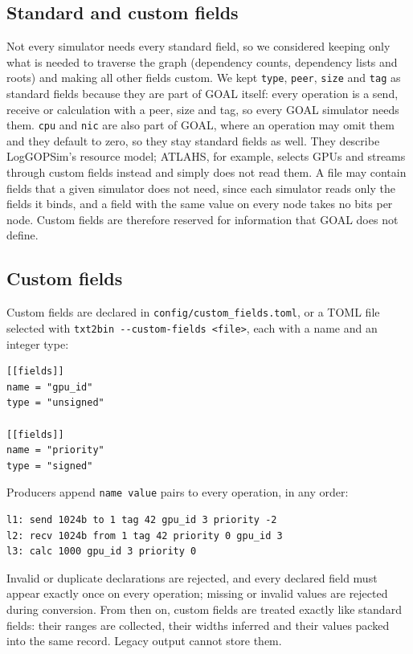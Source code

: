 \documentclass[10pt,a4paper]{article}
\begin{document}
\subsection{Standard and custom fields}

Not every simulator needs every standard field, so we considered keeping only what is needed to traverse the graph (dependency counts, dependency lists and roots) and making all other fields custom. We kept \texttt{type}, \texttt{peer}, \texttt{size} and \texttt{tag} as standard fields because they are part of GOAL itself: every operation is a send, receive or calculation with a peer, size and tag, so every GOAL simulator needs them. \texttt{cpu} and \texttt{nic} are also part of GOAL, where an operation may omit them and they default to zero, so they stay standard fields as well. They describe LogGOPSim's resource model; ATLAHS, for example, selects GPUs and streams through custom fields instead and simply does not read them. A file may contain fields that a given simulator does not need, since each simulator reads only the fields it binds, and a field with the same value on every node takes no bits per node. Custom fields are therefore reserved for information that GOAL does not define.

\hypertarget{custom-fields}{}
\subsection{Custom fields}

Custom fields are declared in \texttt{config/\allowbreak{}custom\_\allowbreak{}fields.\allowbreak{}toml}, or a TOML file selected with \texttt{txt2bin -\allowbreak{}-\allowbreak{}custom-\allowbreak{}fields <file\allowbreak{}>}, each with a name and an integer type:

\begin{lstlisting}
[[fields]]
name = "gpu_id"
type = "unsigned"

[[fields]]
name = "priority"
type = "signed"
\end{lstlisting}

Producers append \texttt{name value} pairs to every operation, in any order:

\begin{lstlisting}
l1: send 1024b to 1 tag 42 gpu_id 3 priority -2
l2: recv 1024b from 1 tag 42 priority 0 gpu_id 3
l3: calc 1000 gpu_id 3 priority 0
\end{lstlisting}

Invalid or duplicate declarations are rejected, and every declared field must appear exactly once on every operation; missing or invalid values are rejected during conversion. From then on, custom fields are treated exactly like standard fields: their ranges are collected, their widths inferred and their values packed into the same record. Legacy output cannot store them.
\end{document}
